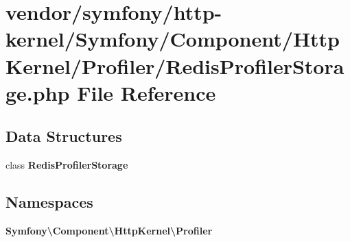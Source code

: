 \section{vendor/symfony/http-\/kernel/\+Symfony/\+Component/\+Http\+Kernel/\+Profiler/\+Redis\+Profiler\+Storage.php File Reference}
\label{_redis_profiler_storage_8php}
\subsection*{Data Structures}
\begin{DoxyCompactItemize}
\item 
class {\bf Redis\+Profiler\+Storage}
\end{DoxyCompactItemize}
\subsection*{Namespaces}
\begin{DoxyCompactItemize}
\item 
 {\bf Symfony\textbackslash{}\+Component\textbackslash{}\+Http\+Kernel\textbackslash{}\+Profiler}
\end{DoxyCompactItemize}
